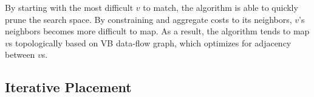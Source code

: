 By starting with the most difficult $v$ to match, the algorithm is able to quickly prune the search space.
By constraining and aggregate costs to its neighbors, $v$'s neighbors becomes more difficult to map. As a
result, the algorithm tends to map $v$s topologically based on VB data-flow graph, which optimizes
for adjacency between $v$s. 
\fi

\subsection{Iterative Placement}

